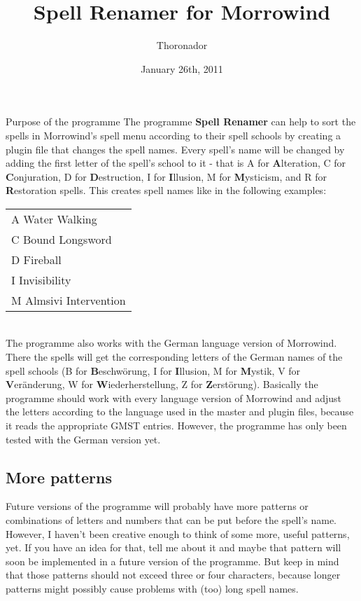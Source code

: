 \documentclass[12pt,oneside,a4paper]{article}
\title{Spell Renamer for Morrowind}
\author{Thoronador}
\date{January 26th, 2011}
\begin{document}
\maketitle

\begin{section}{Purpose of the programme}
The programme \textbf{Spell Renamer} can help to sort the spells in Morrowind's
spell menu according to their spell schools by creating a plugin file that
changes the spell names.
Every spell's name will be changed by adding the first letter of the spell's school
to it - that is A for \textbf{A}lteration, C for \textbf{C}onjuration,
D for \textbf{D}estruction, I for \textbf{I}llusion, M for \textbf{M}ysticism,
and R for \textbf{R}estoration spells.
This creates spell names like in the following examples:\\

\begin{tabular}{l}
A Water Walking\\
C Bound Longsword\\
D Fireball\\
I Invisibility\\
M Almsivi Intervention\\
\end{tabular}
\\

The programme also works with the German language version of Morrowind. There
the spells will get the corresponding letters of the German names of the spell
schools (B for \textbf{B}eschw\"{o}rung, I for \textbf{I}llusion, M for
\textbf{M}ystik, V for \textbf{V}er\"{a}nderung, W for \textbf{W}iederherstellung,
Z for \textbf{Z}erst\"{o}rung).
Basically the programme should work with every language version of Morrowind and
adjust the letters according to the language used in the master and plugin files,
because it reads the appropriate GMST entries. However, the programme has only
been tested with the German version yet.

\subsection{More patterns}
Future versions of the programme will probably have more patterns or combinations
of letters and numbers that can be put before the spell's name. However, I haven't
been creative enough to think of some more, useful patterns, yet. If you have an
idea for that, tell me about it and maybe that pattern will soon be implemented
in a future version of the programme. But keep in mind that those patterns
should not exceed three or four characters, because longer patterns might
possibly cause problems with (too) long spell names.


\end{section}
\end{document}
